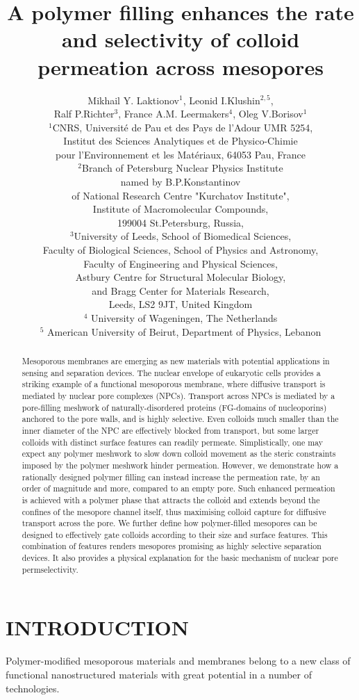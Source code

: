 \documentclass[12pt, a4paper]{article}
\title{A polymer filling enhances the rate and selectivity of colloid permeation across mesopores}
\author{Mikhail Y. Laktionov$^1$, Leonid I.Klushin$^{2,5}$,\\Ralf P.Richter$^3$, France A.M. Leermakers$^4$, Oleg V.Borisov$^1$\\
$^{1}$CNRS, Universit\'e de Pau et des Pays de l'Adour UMR 5254,\\
Institut des Sciences Analytiques et de Physico-Chimie\\
pour l'Environnement et les Mat\'eriaux, 64053 Pau, France \\
$^{2}$Branch of Petersburg Nuclear Physics Institute\\
named by B.P.Konstantinov \\
of National Research Centre "Kurchatov Institute",\\
Institute of Macromolecular Compounds,\\
199004 St.Petersburg, Russia,\\
$^{3}$University of Leeds, School of Biomedical Sciences, \\
Faculty of Biological Sciences, 
School of Physics and Astronomy, \\
Faculty of Engineering and Physical Sciences,\\  
Astbury Centre for Structural Molecular Biology,\\ 
and Bragg Center for Materials Research,\\ 
Leeds, LS2 9JT, United Kingdom\\
$^{4}$ University of Wageningen, The Netherlands\\
$^{5}$ American University of Beirut, Department of Physics, Lebanon
}
\date{}
\begin{document}
\maketitle

\begin{abstract}

Mesoporous membranes are emerging as new materials with potential applications in sensing and separation devices.
The nuclear envelope of eukaryotic cells provides a striking example of a functional mesoporous membrane, where diffusive transport is mediated by nuclear pore complexes (NPCs).
Transport across NPCs is mediated by a pore-filling meshwork of naturally-disordered proteins (FG-domains of nucleoporins) anchored to the pore walls, and is highly selective.
Even colloids much smaller than the inner diameter of the NPC are effectively blocked from transport, but some larger colloids with distinct surface features can readily permeate.
Simplistically, one may expect any polymer meshwork to slow down colloid movement as the steric constraints imposed by the polymer meshwork hinder permeation.
However, we demonstrate how a rationally designed polymer filling can instead increase the permeation rate, by an order of magnitude and more, compared to an empty pore.
Such enhanced permeation is achieved with a polymer phase that attracts the colloid and extends beyond the confines of the mesopore channel itself, thus maximising colloid capture for diffusive transport across the pore.
We further define how polymer-filled mesopores can be designed to effectively gate colloids according to their size and surface features. 
This combination of features renders mesopores promising as highly selective separation devices.
It also provides a physical explanation for the basic mechanism of nuclear pore permselectivity.
\end{abstract}


\section{INTRODUCTION}

Polymer-modified mesoporous materials and membranes belong to a new class of functional nanostructured materials with great potential in a number of technologies. 
\end{document}
